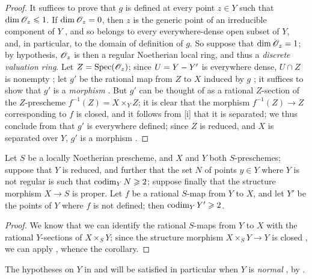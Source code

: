 \begin{proof}
\label{proof-II.7.3.5}
It suffices to prove that $g$ is defined at every point $z\in Y$ such that $\dim\mathscr{O}_z\leqslant1$.
If $\dim\mathscr{O}_z=0$, then $z$ is the generic point of an irreducible component of $Y$ , and so belongs to every everywhere-dense open subset of $Y$, and, in particular, to the domain of definition of $g$.
So suppose that $\dim\mathscr{O}_z=1$; by hypothesis, $\mathscr{O}_z$ is then a regular Noetherian local ring, and thus  a \emph{discrete valuation ring}.
Let $Z=\operatorname{Spec}(\mathscr{O}_z)$;
since $U=Y- Y'$ is everywhere dense, $U\cap Z$ is nonempty ;
let $g'$ be the rational map from $Z$ to $X$ induced by $g$ ;
it suffices to show that $g'$ is a \emph{morphism} .
But $g'$ can be thought of as a rational $Z$-section of the $Z$-prescheme $f^{-1}(Z)=X\times_Y Z$;
it is clear that the morphism $f^{-1}(Z)\to Z$ corresponding to $f$ is closed, and it follows from [i] that it is separated;
we thus conclude from  that $g'$ is everywhere defined;
since $Z$ is reduced, and $X$ is separated over $Y$, $g'$ is a morphism .
\end{proof}

\begin{corollary}[7.3.6]
\label{II.7.3.6}
Let $S$ be a locally Noetherian prescheme, and $X$ and $Y$ both $S$-preschemes;
suppose that $Y$ is reduced, and further that the set $N$ of points $y\in Y$ where $Y$ is not regular is such that $\operatorname{codim}_Y N\geqslant2$;
suppose finally that the structure morphism $X\to S$ is proper.
Let $f$ be a rational $S$-map from $Y$ to $X$, and let $Y'$ be the points of $Y$ where $f$ is not defined;
then $\operatorname{codim}_Y Y'\geqslant2$.
\end{corollary}

\begin{proof}
\label{proof-II.7.3.6}
We know  that we can identify the rational $S$-maps from $Y$ to $X$ with the rational $Y$-sections of $X\times_S Y$;
since the structure morphism $X\times_S Y\to Y$ is closed , we can apply , whence the corollary.
\end{proof}

\begin{remark}[7.3.7]
\label{II.7.3.7}
The hypotheses on $Y$ in  and  will be satisfied in particular when $Y$ is \emph{normal} , by .
\end{remark}

